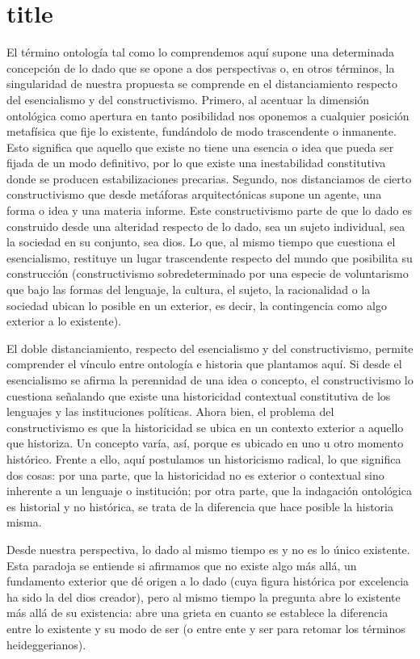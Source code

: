 \section{title}

El término ontología tal como lo comprendemos aquí supone una determinada concepción de lo dado que se opone a dos perspectivas o, en otros términos, la singularidad de nuestra propuesta se comprende en el distanciamiento respecto del esencialismo y del constructivismo. Primero, al acentuar la dimensión ontológica como apertura en tanto posibilidad nos oponemos a cualquier posición metafísica que fije lo existente, fundándolo de modo trascendente o inmanente. Esto significa que aquello que existe no tiene una esencia o idea que pueda ser fijada de un modo definitivo, por lo que existe una inestabilidad constitutiva donde se producen estabilizaciones precarias. Segundo, nos distanciamos de cierto constructivismo que desde metáforas arquitectónicas supone un agente, una forma o idea y una materia informe. Este constructivismo parte de que lo dado es construido desde una alteridad respecto de lo dado, sea un sujeto individual, sea la sociedad en su conjunto, sea dios. Lo que, al mismo tiempo que cuestiona el esencialismo, restituye un lugar trascendente respecto del mundo que posibilita su construcción (constructivismo sobredeterminado por una especie de voluntarismo que bajo las formas del lenguaje, la cultura, el sujeto, la racionalidad o la sociedad ubican lo posible en un exterior, es decir, la contingencia como algo exterior a lo existente).

El doble distanciamiento, respecto del esencialismo y del constructivismo, permite comprender el vínculo entre ontología e historia que plantamos aquí. Si desde el esencialismo se afirma la perennidad de una idea o concepto, el constructivismo lo cuestiona señalando que existe una historicidad contextual constitutiva de los lenguajes y las instituciones políticas. Ahora bien, el problema del constructivismo es que la historicidad se ubica en un contexto exterior a aquello que historiza. Un concepto varía, así, porque es ubicado en uno u otro momento histórico. Frente a ello, aquí postulamos un historicismo radical, lo que significa dos cosas: por una parte, que la historicidad no es exterior o contextual sino inherente a un lenguaje o institución; por otra parte, que la indagación ontológica es historial y no histórica, se trata de la diferencia que hace posible la historia misma.

Desde nuestra perspectiva, lo dado al mismo tiempo es y no es lo único existente. Esta paradoja se entiende si afirmamos que no existe algo más allá, un fundamento exterior que dé origen a lo dado (cuya figura histórica por excelencia ha sido la del dios creador), pero al mismo tiempo la pregunta abre lo existente más allá de su existencia: abre una grieta en cuanto se establece la diferencia entre lo existente y su modo de ser (o entre ente y ser para retomar los términos heideggerianos).

